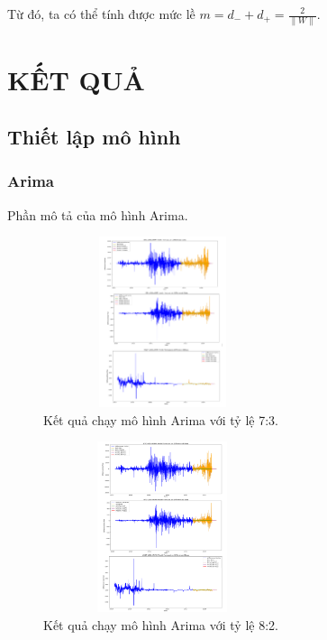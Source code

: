 \documentclass[conference]{IEEEtran}
\begin{document}
Từ đó, ta có thể tính được mức lề \( m = d_{-} + d_{+} = \frac{2}{\| W \|} \).

\section{KẾT QUẢ}
\subsection{Thiết lập mô hình }

\subsubsection{Arima}

Phần mô tả của mô hình Arima.
\begin{figure}[H] %
    \centering
    \includegraphics[width=7cm, height=5cm]{Images/Arima 7-3.png} %
    \caption{Kết quả chạy mô hình Arima với tỷ lệ 7:3.}
    \label{fig:arima-model}
\end{figure}

\begin{figure}[H] %
    \centering
    \includegraphics[width=7cm, height=5cm]{Images/Arima 8-2.png} %
    \caption{Kết quả chạy mô hình Arima với tỷ lệ 8:2.}
    \label{fig:arima-model}
\end{figure}
\end{document}
